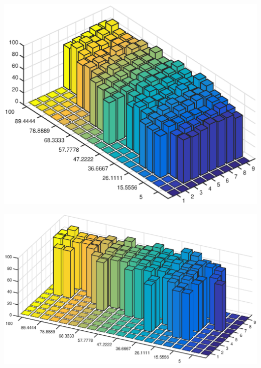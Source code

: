 	\begin{center}
	\begin{minipage}[t]{\linewidth}
	\center
	{
	\includegraphics[width=\MyFactor\textwidth]{Img/c4/pca70} 
		\captionsetup{justification=centering}
	}
	\end{minipage}
	\medskip
	\end{center}
	
	\begin{center}
	\begin{minipage}[t]{\linewidth}
	\center
	{
	\includegraphics[width=\MyFactor\textwidth]{Img/c4/pca80} 
		\captionsetup{justification=centering}
	}
	\end{minipage}
	\medskip
	\end{center}
	
